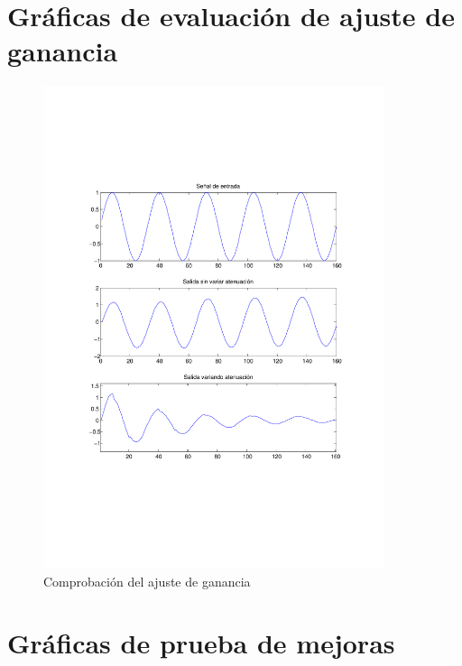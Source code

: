 \documentclass[a4paper,12pt]{article}
\begin{document}
\section{Gráficas de evaluación de ajuste de ganancia}\label{sec:resultadosajuste}
\begin{figure}[hbt]
\begin{center}
\includegraphics[width=10cm]{img/test_adjust.pdf} 
\caption{Comprobación del ajuste de ganancia} \label{fig:adjustgraph}
\end{center}
\end{figure}

\clearpage

\section{Gráficas de prueba de mejoras}\label{sec:resultadosmejoras}
\end{document}

